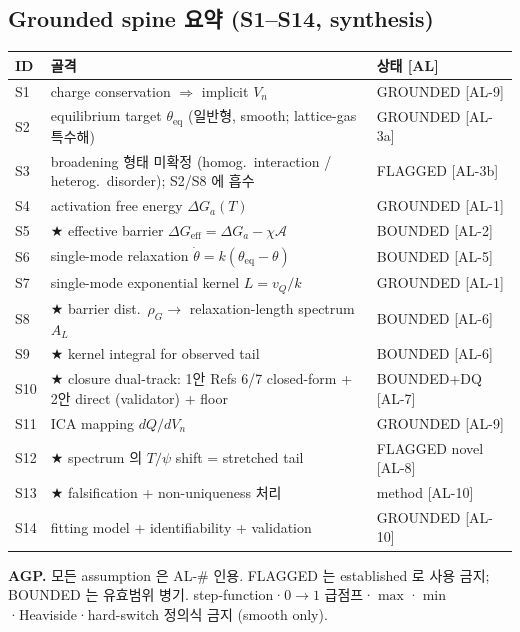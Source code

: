 \documentclass[11pt,a4paper]{article}
\newcommand{\eff}{\mathrm{eff}}
\newcommand{\eq}{\mathrm{eq}}
\newcommand{\AL}[1]{\textsf{[AL-#1]}}
\begin{document}
\subsection{Grounded spine 요약 (S1--S14, synthesis)}\label{sec:spine}
\begin{longtable}{p{} p{} p{}}
\toprule ID & 골격 & 상태 [AL] \\ \midrule \endhead
S1 & charge conservation $\Rightarrow$ implicit $V_n$ & GROUNDED \AL{9} \\
S2 & equilibrium target $\theta_\eq$ (일반형, smooth; lattice-gas 특수해) & GROUNDED \AL{3a} \\
S3 & broadening 형태 미확정 (homog.\ interaction / heterog.\ disorder); S2/S8 에 흡수 & FLAGGED \AL{3b} \\
S4 & activation free energy $\Delta G_a(T)$ & GROUNDED \AL{1} \\
S5 & ★ effective barrier $\Delta G_\eff=\Delta G_a-\chi\mathcal A$ & BOUNDED \AL{2} \\
S6 & single-mode relaxation $\dot\theta=k(\theta_\eq-\theta)$ & BOUNDED \AL{5} \\
S7 & single-mode exponential kernel $L=v_Q/k$ & GROUNDED \AL{1} \\
S8 & ★ barrier dist.\ $\rho_G\to$ relaxation-length spectrum $A_L$ & BOUNDED \AL{6} \\
S9 & ★ kernel integral for observed tail & BOUNDED \AL{6} \\
S10 & ★ closure dual-track: 1안 Refs 6/7 closed-form + 2안 direct (validator) + floor & BOUNDED+DQ \AL{7} \\
S11 & ICA mapping $dQ/dV_n$ & GROUNDED \AL{9} \\
S12 & ★ spectrum 의 $T/\psi$ shift = stretched tail & FLAGGED novel \AL{8} \\
S13 & ★ falsification + non-uniqueness 처리 & method \AL{10} \\
S14 & fitting model + identifiability + validation & GROUNDED \AL{10} \\
\bottomrule
\end{longtable}
\textbf{AGP.} 모든 assumption 은 AL-\# 인용. FLAGGED 는 established 로 사용 금지; BOUNDED
는 유효범위 병기. step-function·$0\!\to\!1$ 급점프·$\max$·$\min$·Heaviside·hard-switch
정의식 금지 (smooth only).

\end{document}
